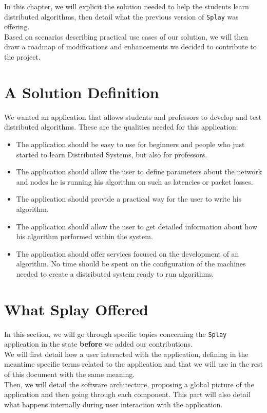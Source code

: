 \documentclass{eplmastersthesis}
\begin{document}
    In this chapter, we will explicit the solution needed to help the
    students learn distributed algorithms, then detail what the previous
    version of \texttt{Splay} was offering.\\
    Based on scenarios describing practical use cases of our solution, we will
    then draw a roadmap of modifications and enhancements we decided to
    contribute to the project.

    \section{A Solution Definition}

      We wanted an application that allows students and professors to develop
      and test distributed algorithms. These are the qualities needed for this
      application:

      \begin{itemize}
        \item The application should be easy to use for beginners and people
        who just started to learn Distributed Systems, but also for professors.
        \item The application should allow the user to define parameters about
        the network and nodes he is running his algorithm on such as latencies
        or packet losses.
        \item The application should provide a practical way for the user
        to write his algorithm.
        \item The application should allow the user to get detailed information
        about how his algorithm performed within the system.
        \item The application should offer services focused on the development
        of an algorithm. No time should be spent on the configuration of the
        machines needed to create a distributed system ready to run algorithms.
      \end{itemize}

    \section{What Splay Offered}

      In this section, we will go through specific topics concerning the \texttt{Splay}
      application in the state \textbf{before} we added our contributions.\\
      We will first detail how a user interacted with the application,
      defining in the meantime specific terms related to
      the application and that we will use in the rest of this document with
      the same meaning.\\
      Then, we will detail the software architecture, proposing a global
      picture of the application and then going through each component. This
      part will also detail what happens internally during user interaction
      with the application.
\end{document}
